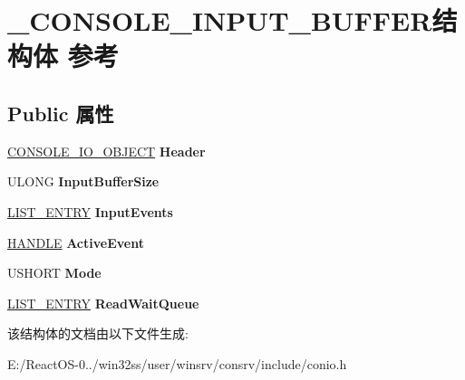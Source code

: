 \hypertarget{struct___c_o_n_s_o_l_e___i_n_p_u_t___b_u_f_f_e_r}{}\section{\+\_\+\+C\+O\+N\+S\+O\+L\+E\+\_\+\+I\+N\+P\+U\+T\+\_\+\+B\+U\+F\+F\+E\+R结构体 参考}
\label{struct___c_o_n_s_o_l_e___i_n_p_u_t___b_u_f_f_e_r}
\subsection*{Public 属性}
\begin{DoxyCompactItemize}
\item 
\mbox{\label{struct___c_o_n_s_o_l_e___i_n_p_u_t___b_u_f_f_e_r_a330b7779083bd5ca26831bc45fa91c40}} 
\hyperlink{struct___c_o_n_s_o_l_e___i_o___o_b_j_e_c_t}{C\+O\+N\+S\+O\+L\+E\+\_\+\+I\+O\+\_\+\+O\+B\+J\+E\+CT} {\bfseries Header}
\item 
\mbox{\label{struct___c_o_n_s_o_l_e___i_n_p_u_t___b_u_f_f_e_r_a872c6cf7cf1c7a1374ef468015ee8bda}} 
U\+L\+O\+NG {\bfseries Input\+Buffer\+Size}
\item 
\mbox{\label{struct___c_o_n_s_o_l_e___i_n_p_u_t___b_u_f_f_e_r_abd52f19ed13227dd761bd4073927a441}} 
\hyperlink{struct___l_i_s_t___e_n_t_r_y}{L\+I\+S\+T\+\_\+\+E\+N\+T\+RY} {\bfseries Input\+Events}
\item 
\mbox{\label{struct___c_o_n_s_o_l_e___i_n_p_u_t___b_u_f_f_e_r_aeea81c29d82f6ff9a779d9640de11939}} 
\hyperlink{interfacevoid}{H\+A\+N\+D\+LE} {\bfseries Active\+Event}
\item 
\mbox{\label{struct___c_o_n_s_o_l_e___i_n_p_u_t___b_u_f_f_e_r_af9428feb6ef7fe1cf4fe877511e1d0d6}} 
U\+S\+H\+O\+RT {\bfseries Mode}
\item 
\mbox{\label{struct___c_o_n_s_o_l_e___i_n_p_u_t___b_u_f_f_e_r_a70ad37cf003fc5e5972b134b469ff52f}} 
\hyperlink{struct___l_i_s_t___e_n_t_r_y}{L\+I\+S\+T\+\_\+\+E\+N\+T\+RY} {\bfseries Read\+Wait\+Queue}
\end{DoxyCompactItemize}


该结构体的文档由以下文件生成\+:\begin{DoxyCompactItemize}
\item 
E\+:/\+React\+O\+S-\/0../win32ss/user/winsrv/consrv/include/conio.\+h\end{DoxyCompactItemize}
